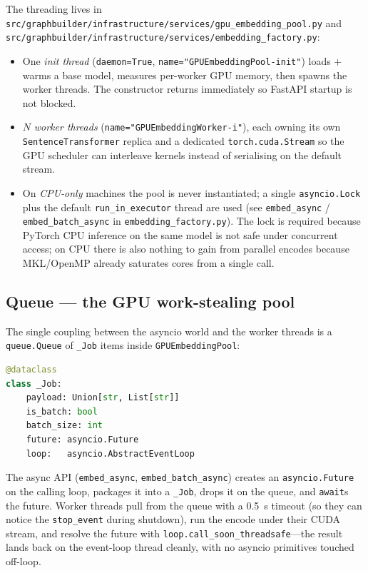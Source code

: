 \documentclass[11pt,a4paper]{article}
\begin{document}
The threading lives in
\texttt{src/graphbuilder/infrastructure/services/gpu\_embedding\_pool.py}
and \texttt{src/graphbuilder/infrastructure/services/embedding\_factory.py}:

\begin{itemize}[leftmargin=*]
  \item One \emph{init thread} (\texttt{daemon=True},
        \texttt{name="GPUEmbeddingPool-init"}) loads + warms a base
        model, measures per-worker GPU memory, then spawns the worker
        threads. The constructor returns immediately so FastAPI startup
        is not blocked.
  \item $N$ \emph{worker threads}
        (\texttt{name="GPUEmbeddingWorker-i"}), each owning its own
        \texttt{SentenceTransformer} replica and a dedicated
        \texttt{torch.cuda.Stream} so the GPU scheduler can interleave
        kernels instead of serialising on the default stream.
  \item On \emph{CPU-only} machines the pool is never instantiated; a
        single \texttt{asyncio.Lock} plus the default
        \texttt{run\_in\_executor} thread are used (see
        \texttt{embed\_async} / \texttt{embed\_batch\_async} in
        \texttt{embedding\_factory.py}). The lock is required because
        PyTorch CPU inference on the same model is not safe under
        concurrent access; on CPU there is also nothing to gain from
        parallel encodes because MKL/OpenMP already saturates cores
        from a single call.
\end{itemize}

\subsection{Queue --- the GPU work-stealing pool}

The single coupling between the asyncio world and the worker threads is
a \texttt{queue.Queue} of \texttt{\_Job} items inside
\texttt{GPUEmbeddingPool}:

\begin{lstlisting}[language=Python]
@dataclass
class _Job:
    payload: Union[str, List[str]]
    is_batch: bool
    batch_size: int
    future: asyncio.Future
    loop:   asyncio.AbstractEventLoop
\end{lstlisting}

The async API (\texttt{embed\_async}, \texttt{embed\_batch\_async}) creates
an \texttt{asyncio.Future} on the calling loop, packages it into a
\texttt{\_Job}, drops it on the queue, and \texttt{await}s the future.
Worker threads pull from the queue with a 0.5~s timeout (so they can
notice the \texttt{stop\_event} during shutdown), run the encode under
their CUDA stream, and resolve the future with
\texttt{loop.call\_soon\_threadsafe}---the result lands back on the
event-loop thread cleanly, with no asyncio primitives touched
off-loop.
\end{document}
